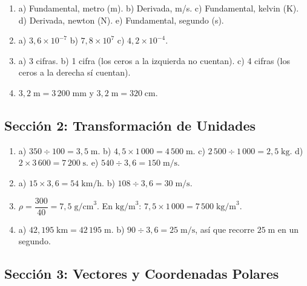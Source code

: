 \documentclass[12pt, letterpaper]{article}
\begin{document}
  \begin{enumerate}[leftmargin=*, label=\textbf{\arabic*.}]
    \item a) Fundamental, metro (m). \quad b) Derivada, m/s. \quad c) Fundamental, kelvin (K). \quad d) Derivada, newton (N). \quad e) Fundamental, segundo (s).

    \item a) $3{,}6 \times 10^{-7}$ \quad b) $7{,}8 \times 10^{7}$ \quad c) $4{,}2 \times 10^{-4}$.

    \item a) 3 cifras. \quad b) 1 cifra (los ceros a la izquierda no cuentan). \quad c) 4 cifras (los ceros a la derecha sí cuentan).

    \item $3{,}2\;\text{m} = 3\,200\;\text{mm}$ y $3{,}2\;\text{m} = 320\;\text{cm}$.
  \end{enumerate}

  \newpage

  \subsection*{Sección 2: Transformación de Unidades}

  \begin{enumerate}[leftmargin=*, label=\textbf{\arabic*.}]
    \item a) $350 \div 100 = 3{,}5\;\text{m}$.
          \quad b) $4{,}5 \times 1\,000 = 4\,500\;\text{m}$.
          \quad c) $2\,500 \div 1\,000 = 2{,}5\;\text{kg}$.
          \quad d) $2 \times 3\,600 = 7\,200\;\text{s}$.
          \quad e) $540 \div 3{,}6 = 150\;\text{m/s}$.

    \item a) $15 \times 3{,}6 = 54\;\text{km/h}$. \quad b) $108 \div 3{,}6 = 30\;\text{m/s}$.

    \item $\rho = \dfrac{300}{40} = 7{,}5\;\text{g/cm}^3$. \quad En $\text{kg/m}^3$: $7{,}5 \times 1\,000 = 7\,500\;\text{kg/m}^3$.

    \item a) $42{,}195\;\text{km} = 42\,195\;\text{m}$.
          \quad b) $90 \div 3{,}6 = 25\;\text{m/s}$, así que recorre $25\;\text{m}$ en un segundo.
  \end{enumerate}

  \newpage

  \subsection*{Sección 3: Vectores y Coordenadas Polares}
\end{document}
